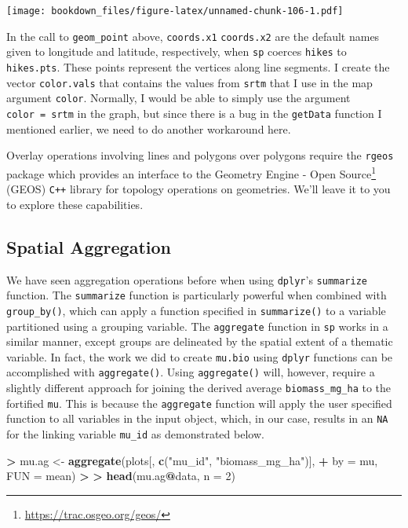 \documentclass[]{krantz}
\makeatletter
\newenvironment{Shaded}{\begin{snugshade}}{\end{snugshade}}
\newcommand{\DataTypeTok}[1]{\textcolor[rgb]{0.27,0.27,0.27}{#1}}
\newcommand{\DecValTok}[1]{\textcolor[rgb]{0.06,0.06,0.06}{#1}}
\newcommand{\ErrorTok}[1]{\textcolor[rgb]{0.14,0.14,0.14}{\textbf{#1}}}
\newcommand{\KeywordTok}[1]{\textcolor[rgb]{0.27,0.27,0.27}{\textbf{#1}}}
\newcommand{\NormalTok}[1]{#1}
\newcommand{\OperatorTok}[1]{\textcolor[rgb]{0.43,0.43,0.43}{\textbf{#1}}}
\newcommand{\StringTok}[1]{\textcolor[rgb]{0.5,0.5,0.5}{#1}}
\renewcommand{\href}[2]{#2\footnote{\url{#1}}}
\newenvironment{kframe}{%
\medskip{}
\setlength{\fboxsep}{.8em}
 \def\at@end@of@kframe{}%
 \ifinner\ifhmode%
  \def\at@end@of@kframe{\end{minipage}}%
  \begin{minipage}{\columnwidth}%
 \fi\fi%
 \def\FrameCommand##1{\hskip\@totalleftmargin \hskip-\fboxsep
 \colorbox{shadecolor}{##1}\hskip-\fboxsep
     \hskip-\linewidth \hskip-\@totalleftmargin \hskip\columnwidth}%
 \MakeFramed {\advance\hsize-\width
   \@totalleftmargin\z@ \linewidth\hsize
   \@setminipage}}%
 {\par\unskip\endMakeFramed%
 \at@end@of@kframe}
\renewenvironment{Shaded}{\begin{kframe}}{\end{kframe}}
\makeatother
\begin{document}
\texttt{[image: bookdown\_files/figure-latex/unnamed-chunk-106-1.pdf]}

In the call to \texttt{geom\_point} above, \texttt{coords.x1} \texttt{coords.x2} are the default names given to longitude and latitude, respectively, when \texttt{sp} coerces \texttt{hikes} to \texttt{hikes.pts}. These points represent the vertices along line segments. I create the vector \texttt{color.vals} that contains the values from \texttt{srtm} that I use in the map argument \texttt{color}. Normally, I would be able to simply use the argument \texttt{color\ =\ srtm} in the graph, but since there is a bug in the \texttt{getData} function I mentioned earlier, we need to do another workaround here.

Overlay operations involving lines and polygons over polygons require the \texttt{rgeos} package which provides an interface to the \href{https://trac.osgeo.org/geos/}{Geometry Engine - Open Source} (GEOS) \texttt{C++} library for topology operations on geometries. We'll leave it to you to explore these capabilities.

\hypertarget{spatial-aggregation}{%
\subsection{Spatial Aggregation}\label{spatial-aggregation}}

We have seen aggregation operations before when using \texttt{dplyr}'s \texttt{summarize} function. The \texttt{summarize} function is particularly powerful when combined with \texttt{group\_by()}, which can apply a function specified in \texttt{summarize()} to a variable partitioned using a grouping variable. The \texttt{aggregate} function in \texttt{sp} works in a similar manner, except groups are delineated by the spatial extent of a thematic variable. In fact, the work we did to create \texttt{mu.bio} using \texttt{dplyr} functions can be accomplished with \texttt{aggregate()}. Using \texttt{aggregate()} will, however, require a slightly different approach for joining the derived average \texttt{biomass\_mg\_ha} to the fortified \texttt{mu}. This is because the \texttt{aggregate} function will apply the user specified function to all variables in the input object, which, in our case, results in an \texttt{NA} for the linking variable \texttt{mu\_id} as demonstrated below.

\begin{Shaded}
\begin{Highlighting}[]
\OperatorTok{>}\StringTok{ }\NormalTok{mu.ag <-}\StringTok{ }\KeywordTok{aggregate}\NormalTok{(plots[, }\KeywordTok{c}\NormalTok{(}\StringTok{"mu_id"}\NormalTok{, }\StringTok{"biomass_mg_ha"}\NormalTok{)], }
\OperatorTok{+}\StringTok{   }\DataTypeTok{by =}\NormalTok{ mu, }\DataTypeTok{FUN =}\NormalTok{ mean)}
\OperatorTok{>}\StringTok{ }
\ErrorTok{>}\StringTok{ }\KeywordTok{head}\NormalTok{(mu.ag}\OperatorTok{@}\NormalTok{data, }\DataTypeTok{n =} \DecValTok{2}\NormalTok{)}
\end{Highlighting}
\end{Shaded}
\end{document}
